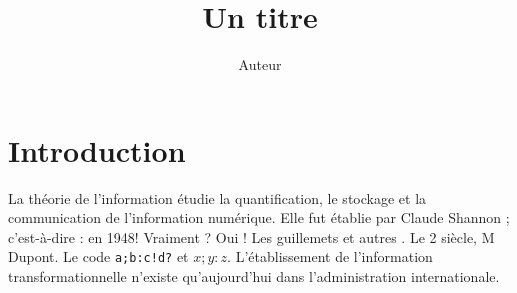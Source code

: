 \documentclass{article}
\title{Un titre}
\author{Auteur}
\begin{document}
\maketitle
\tableofcontents
\section{Introduction}
La théorie de l'information étudie la quantification, le stockage et la communication de l'information numérique. Elle fut établie par Claude Shannon ; c'est-à-dire : en 1948! Vraiment ? Oui !
Les \og guillemets\fg{} et \og autres \fg. Le 2 siècle, M Dupont. Le code \texttt{a;b:c!d?} et $x;y:z$.
L'établissement de l'information transformationnelle n'existe qu'aujourd'hui dans l'administration internationale.
\end{document}
